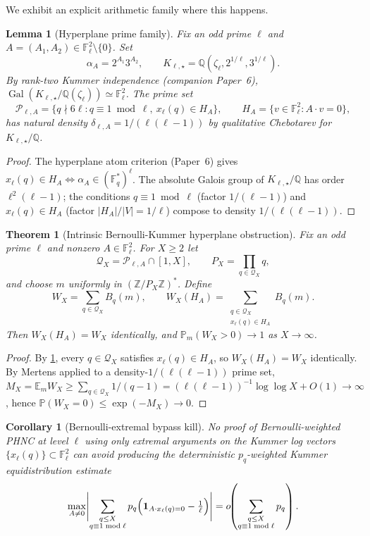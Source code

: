 \documentclass[11pt]{article}
\newtheorem{theorem}{Theorem}
\newtheorem{lemma}{Lemma}
\newtheorem{corollary}{Corollary}
\newcommand{\F}{\mathbb F}
\begin{document}
We exhibit an explicit arithmetic family where this happens.

\begin{lemma}[Hyperplane prime family]\label{L:hyperplane-family}
Fix an odd prime \(\ell\) and \(A=(A_1,A_2)\in\F_\ell^2\setminus\{0\}\).  Set
\[
\alpha_A=2^{A_1}3^{A_2},\qquad K_{\ell,\star}=\mathbb Q(\zeta_\ell,2^{1/\ell},3^{1/\ell}).
\]
By rank-two Kummer independence (companion Paper~6), \(\operatorname{Gal}(K_{\ell,\star}/\mathbb Q(\zeta_\ell))\simeq\F_\ell^2\).  The prime set
\[
\mathcal P_{\ell,A}=\{q\nmid 6\ell:q\equiv 1\bmod\ell,\ x_\ell(q)\in H_A\},
\qquad H_A=\{v\in\F_\ell^2:A\cdot v=0\},
\]
has natural density \(\delta_{\ell,A}=1/(\ell(\ell-1))\) by qualitative Chebotarev for \(K_{\ell,\star}/\mathbb Q\).
\end{lemma}

\begin{proof}
The hyperplane atom criterion (Paper~6) gives \(x_\ell(q)\in H_A\Leftrightarrow\alpha_A\in(\F_q^*)^\ell\).  The absolute Galois group of \(K_{\ell,\star}/\mathbb Q\) has order \(\ell^2(\ell-1)\); the conditions \(q\equiv 1\bmod\ell\) (factor \(1/(\ell-1)\)) and \(x_\ell(q)\in H_A\) (factor \(|H_A|/|V|=1/\ell\)) compose to density \(1/(\ell(\ell-1))\).
\end{proof}

\begin{theorem}[Intrinsic Bernoulli-Kummer hyperplane obstruction]\label{T:bernoulli-obstruction}
Fix an odd prime \(\ell\) and nonzero \(A\in\F_\ell^2\).  For \(X\ge 2\) let
\[
\mathcal Q_X=\mathcal P_{\ell,A}\cap[1,X],\qquad P_X=\prod_{q\in\mathcal Q_X}q,
\]
and choose \(m\) uniformly in \((\mathbb Z/P_X\mathbb Z)^*\).  Define
\[
W_X=\sum_{q\in\mathcal Q_X}B_q(m),\qquad W_X(H_A)=\sum_{\substack{q\in\mathcal Q_X\\ x_\ell(q)\in H_A}}B_q(m).
\]
Then \(W_X(H_A)=W_X\) identically, and \(\mathbb P_m(W_X>0)\to 1\) as \(X\to\infty\).
\end{theorem}

\begin{proof}
By \cref{L:hyperplane-family}, every \(q\in\mathcal Q_X\) satisfies \(x_\ell(q)\in H_A\), so \(W_X(H_A)=W_X\) identically.  By Mertens applied to a density-\(1/(\ell(\ell-1))\) prime set,
\(M_X=\mathbb E_m W_X\ge\sum_{q\in\mathcal Q_X}1/(q-1)=(\ell(\ell-1))^{-1}\log\log X+O(1)\to\infty\),
hence \(\mathbb P(W_X=0)\le\exp(-M_X)\to 0\).
\end{proof}

\begin{corollary}[Bernoulli-extremal bypass kill]\label{C:bernoulli-kill}
No proof of Bernoulli-weighted PHNC at level \(\ell\) using only extremal arguments on the Kummer log vectors \(\{x_\ell(q)\}\subset\F_\ell^2\) can avoid producing the deterministic \(p_q\)-weighted Kummer equidistribution estimate
\[
\max_{A\ne 0}\Biggl|\sum_{\substack{q\le X\\ q\equiv 1\bmod\ell}}p_q\Bigl(\mathbf 1_{A\cdot x_\ell(q)=0}-\tfrac1\ell\Bigr)\Biggr|=o\!\!\left(\sum_{\substack{q\le X\\ q\equiv 1\bmod\ell}}p_q\right).
\]
\end{corollary}
\end{document}
